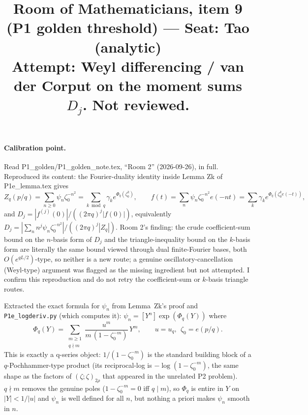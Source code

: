 \documentclass[11pt]{article}
\title{Room of Mathematicians, item 9 (P1 golden threshold) --- Seat: Tao (analytic)\\
\small Attempt: Weyl differencing / van der Corput on the moment sums $D_j$. Not reviewed.}
\date{}
\begin{document}
\maketitle

\paragraph{Calibration point.} Read P1\_golden/P1\_golden\_note.tex, ``Room 2'' (2026-09-26), in
full. Reproduced its content: the Fourier-duality identity inside Lemma Zk of P1e\_lemma.tex gives
\[Z_q(p/q)=\sum_{n\ge0}\psi_n\zeta_0^{-n^2}=\sum_{k\bmod q}\gamma_k e^{\Phi_q(\zeta_0^k)},\qquad
f(t)=\sum_n\psi_n\zeta_0^{-n^2}e(-nt)=\sum_k\gamma_k e^{\Phi_q(\zeta_0^k e(-t))},\]
and $D_j=|f^{(j)}(0)|/((2\pi q)^j|f(0)|)$, equivalently $D_j=|\sum_n n^j\psi_n\zeta_0^{-n^2}|/
((2\pi q)^j|Z_q|)$. Room 2's finding: the crude coefficient-sum bound on the $n$-basis form of
$D_j$ and the triangle-inequality bound on the $k$-basis form are literally the same bound viewed
through dual finite-Fourier bases, both $O(e^{qL/2})$-type, so neither is a new route; a genuine
oscillatory-cancellation (Weyl-type) argument was flagged as the missing ingredient but not
attempted. I confirm this reproduction and do not retry the coefficient-sum or $k$-basis triangle
routes.

Extracted the exact formula for $\psi_n$ from Lemma~Zk's proof and \texttt{P1e\_logderiv.py} (which
computes it): $\psi_n=[Y^n]\exp(\Phi_q(Y))$ where
\[\Phi_q(Y)=\sum_{\substack{m\ge1\\ q\nmid m}}\frac{u^m}{m\,(1-\zeta_0^{-m})}\,Y^m,\qquad
u=u_q,\ \ \zeta_0=e(p/q).\]
This is exactly a q-series object: $1/(1-\zeta_0^{-m})$ is the standard building block of a
$q$-Pochhammer-type product (its reciprocal-log is $-\log(1-\zeta_0^{-m})$, the same shape as the
factors of $(\zeta;\zeta)_{2\rho}$ that appeared in the unrelated P2 problem). $q\nmid m$ removes
the genuine poles ($1-\zeta_0^{-m}=0$ iff $q\mid m$), so $\Phi_q$ is entire in $Y$ on $|Y|<1/|u|$
and $\psi_n$ is well defined for all $n$, but nothing a priori makes $\psi_n$ smooth in $n$.
\end{document}
